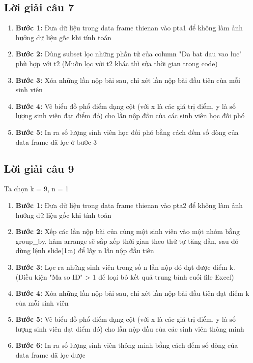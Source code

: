 \documentclass[12pt,a4paper]{article}  %
\begin{document}
\subsection{Lời giải câu 7}
\begin{enumerate}
    \item \textbf{Bước 1:} Đưa dữ liệu trong data frame thienan vào pta1 để không làm ảnh hưởng dữ liệu gốc khi tính toán
    \item \textbf{Bước 2:} Dùng subset lọc những phần tử của column "Da bat dau vao luc" phù hợp với t2 (Muốn lọc với t2 khác thì sửa thời gian trong code)
    \item \textbf{Bước 3:} Xóa những lần nộp bài sau, chỉ xét lần nộp bài đầu tiên của mỗi sinh viên
    \item \textbf{Bước 4:} Vẽ biểu đồ phổ điểm dạng cột (với x là các giá trị điểm, y là số lượng sinh viên đạt điểm đó) cho lần nộp đầu của các sinh viên học đối phó
    \item \textbf{Bước 5:} In ra số lượng sinh viên học đối phó bằng cách đếm số dòng của data frame đã lọc ở bước 3
\end{enumerate}
\subsection{Lời giải câu 9}
 Ta chọn k = 9, n = 1
\begin{enumerate}
    \item \textbf{Bước 1:} Đưa dữ liệu trong data frame thienan vào pta2 để không làm ảnh hưởng dữ liệu gốc khi tính toán
    \item \textbf{Bước 2:} Xếp các lần nộp bài của cùng một sinh viên vào một nhóm bằng group\_by, hàm arrange sẽ sắp xếp thời gian theo thứ tự tăng dần, sau đó dùng lệnh slide(1:n) để lấy n lần nộp đầu tiên
    \item \textbf{Bước 3:} Lọc ra những sinh viên trong số n lần nộp đó đạt được điểm k. (Điều kiện "Ma so ID" > 1 để loại bỏ kết quả trung bình cuối file Excel)
    \item \textbf{Bước 4:} Xóa những lần nộp bài sau, chỉ xét lần nộp bài đầu tiên đạt điểm k của mỗi sinh viên
    \item \textbf{Bước 5:} Vẽ biểu đồ phổ điểm dạng cột (với x là các giá trị điểm, y là số lượng sinh viên đạt điểm đó) cho lần nộp đầu của các sinh viên thông minh
    \item \textbf{Bước 6:} In ra số lượng sinh viên thông minh bằng cách đếm số dòng của data frame đã lọc được
\end{enumerate}
\newpage
\end{document}
